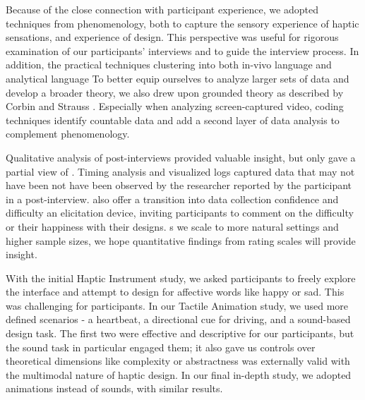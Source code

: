 Because of the close connection with participant experience, we adopted techniques from phenomenology, both to capture the sensory experience of haptic sensations, and  experience of design.
This perspective was useful for rigorous examination of our participants' interviews and to guide the interview process.
In addition, the practical techniques  clustering  into both in-vivo language and analytical language  %
To better equip ourselves to analyze larger sets of data and develop a broader theory, we also drew upon grounded theory as described by Corbin and Strauss \cite{Corbin2008}.
Especially when analyzing screen-captured video, coding techniques  identify countable data and add a second layer of data analysis to complement phenomenology.

Qualitative analysis of post-interviews provided valuable insight, but only gave a partial view of \osE{\haxd}.
Timing analysis and visualized logs captured data that may not have been not have been observed by the researcher  reported by the participant in a post-interview.
 also offer a transition into  data collection 
 confidence and difficulty 
 an elicitation device, inviting participants to  comment on the difficulty or their happiness with their designs.
s we scale to more natural settings and higher sample sizes, we hope quantitative findings from rating scales will provide  insight. %


With the initial Haptic Instrument study, we asked participants to freely explore the interface and attempt to design for affective words like happy or sad.
This was challenging for participants. %
In our Tactile Animation study, we used more defined scenarios - a heartbeat, a directional cue for driving, and a sound-based design task.
The first two were effective and descriptive for our participants, but the sound task in particular engaged them; it also gave us controls over theoretical dimensions like complexity or abstractness  was externally valid with the multimodal nature of haptic design.
In our final in-depth study, we adopted animations instead of sounds, with similar results.





